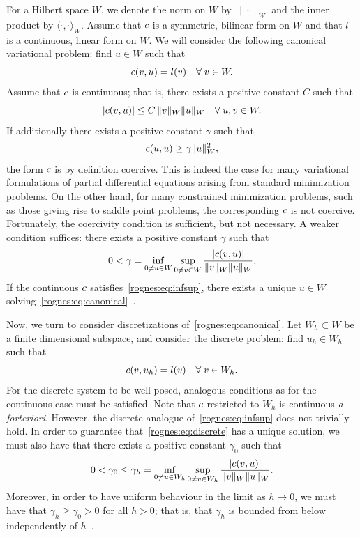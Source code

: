 For a Hilbert space $W$, we denote the norm on $W$ by
$\|\cdot\|_{W}$ and the inner product by $\langle \cdot, \cdot
\rangle_{W}$. Assume that $c$ is a symmetric, bilinear
form on $W$ and that $l$ is a continuous, linear form on
$W$. We will consider the following canonical variational
problem: find $u \in W$ such that
\begin{equation}
  \label{rognes:eq:canonical}
  c(v, u) = l(v) \quad \forall \; v \in W.
\end{equation}
Assume that $c$ is continuous; that is, there exists a positive
constant $C$ such that
\begin{equation*}
  |c(v, u)| \leq C \, \|v\|_{W} \|u\|_{W}
  \quad \forall \; u, v \in W.
\end{equation*}
If additionally there exists a positive constant $\gamma$ such that
\begin{equation*}
  c(u, u) \geq \gamma \|u\|_{W}^2,
\end{equation*}
the form $c$ is by definition coercive. This is indeed the case
for many variational formulations of partial differential equations
arising from standard minimization problems. On the other hand, for
many constrained minimization problems, such as those giving rise to
saddle point problems, the corresponding $c$ is not coercive.
Fortunately, the coercivity condition is sufficient, but not
necessary. A weaker condition suffices: there exists a positive
constant $\gamma$ such that
\begin{equation}
  \label{rognes:eq:infsup}
  0 < \gamma = \inf_{0 \not = u \in W} \sup_{0 \not = v \in W}
  \frac{|c(v,  u)|}{\|v\|_{W}\|u\|_{W}}.
\end{equation}
If the continuous $c$ satisfies~\eqref{rognes:eq:infsup}, there
exists a unique $u \in W$
solving~\eqref{rognes:eq:canonical}~\cite{Babuska1973}.

Now, we turn to consider discretizations
of~\eqref{rognes:eq:canonical}. Let $W_h \subset W$ be a
finite dimensional subspace, and consider the discrete problem: find
$u_h \in W_h$ such that
\begin{equation}
  \label{rognes:eq:discrete}
  c(v, u_h) = l(v) \quad \forall \; v \in W_h.
\end{equation}
For the discrete system to be well-posed, analogous conditions as for
the continuous case must be satisfied. Note that $c$ restricted
to $W_h$ is continuous \emph{a forteriori}. However, the discrete
analogue of~\eqref{rognes:eq:infsup} does not trivially hold. In order
to guarantee that~\eqref{rognes:eq:discrete} has a unique solution, we
must also have that there exists a positive constant $\gamma_0$ such
that
\begin{equation}
  \label{rognes:eq:infsup:discrete}
  0 < \gamma_0 \leq \gamma_h = \inf_{0 \not = u \in W_h} \sup_{0
    \not = v \in W_h} \frac{|c(v, u)|}{\|v\|_{W}\|u\|_{W}}.
\end{equation}
Moreover, in order to have uniform behaviour in the limit as $h
\rightarrow 0$, we must have that $\gamma_h \geq \gamma_0 > 0$ for all
$h > 0$; that is, that $\gamma_h$ is bounded from below independently
of $h$~\cite{Babuska1973}.

